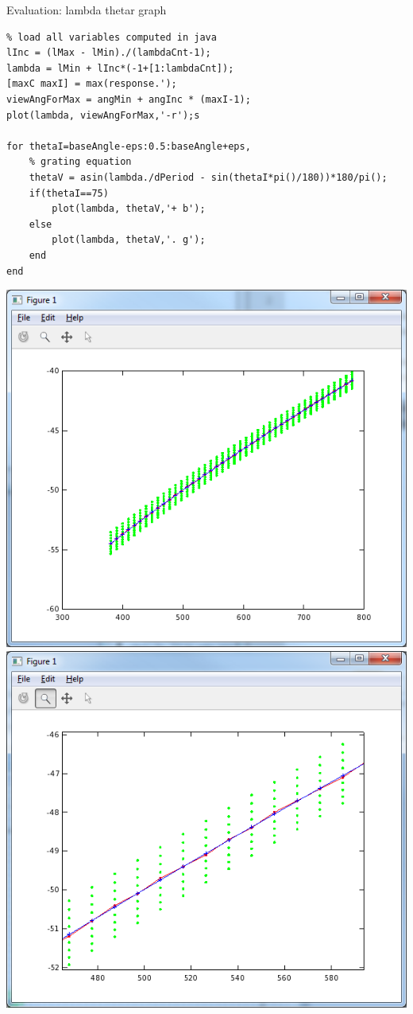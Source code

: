 \begin{algorithm}
\caption{Evaluation: lambda thetar graph}
\begin{lstlisting}
% load all variables computed in java
lInc = (lMax - lMin)./(lambdaCnt-1);
lambda = lMin + lInc*(-1+[1:lambdaCnt]);
[maxC maxI] = max(response.');
viewAngForMax = angMin + angInc * (maxI-1);
plot(lambda, viewAngForMax,'-r');s

for thetaI=baseAngle-eps:0.5:baseAngle+eps,
	% grating equation
	thetaV = asin(lambda./dPeriod - sin(thetaI*pi()/180))*180/pi();
	if(thetaI==75)
		plot(lambda, thetaV,'+ b');
	else
		plot(lambda, thetaV,'. g');
	end
end

\end{lstlisting}
\end{algorithm}

\includegraphics[scale=0.5]{images/blaze2500_75.png}
\includegraphics[scale=0.5]{images/blaze2500_75_closeup1.png}
